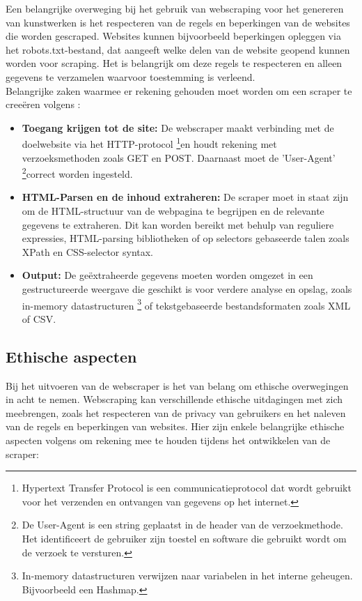 Een belangrijke overweging bij het gebruik van webscraping voor het genereren van kunstwerken is het respecteren van de regels en beperkingen van de websites die worden gescraped. Websites kunnen bijvoorbeeld beperkingen opleggen via het robots.txt-bestand, dat aangeeft welke delen van de website geopend kunnen worden voor scraping. Het is belangrijk om deze regels te respecteren en alleen gegevens te verzamelen waarvoor toestemming is verleend. \\

Belangrijke zaken waarmee er rekening gehouden moet worden om een scraper te creeëren volgens \autocite{BIO2014}:

\begin{itemize}
    \item \textbf{Toegang krijgen tot de site:} De webscraper maakt verbinding met de doelwebsite via het HTTP-protocol \footnote{Hypertext Transfer Protocol is een communicatieprotocol dat wordt gebruikt voor het verzenden en ontvangen van gegevens op het internet.}en houdt rekening met verzoeksmethoden zoals GET en POST. Daarnaast moet de 'User-Agent' \footnote{De User-Agent is een string geplaatst in de header van de verzoekmethode. Het identificeert de gebruiker zijn toestel en software die gebruikt wordt om de verzoek te versturen.}correct worden ingesteld.
    \item \textbf{HTML-Parsen en de inhoud extraheren:} De scraper moet in staat zijn om de HTML-structuur van de webpagina te begrijpen en de relevante gegevens te extraheren. Dit kan worden bereikt met behulp van reguliere expressies, HTML-parsing bibliotheken of op selectors gebaseerde talen zoals XPath en CSS-selector syntax.
    \item \textbf{Output:} De geëxtraheerde gegevens moeten worden omgezet in een gestructureerde weergave die geschikt is voor verdere analyse en opslag, zoals in-memory datastructuren \footnote{In-memory datastructuren verwijzen naar variabelen in het interne geheugen. Bijvoorbeeld een Hashmap.} of tekstgebaseerde bestandsformaten zoals XML of CSV.
\end{itemize}

\subsection{Ethische aspecten}
\label{subsection:scraper-ethische-aspecten}
Bij het uitvoeren van de webscraper is het van belang om ethische overwegingen in acht te nemen. Webscraping kan verschillende ethische uitdagingen met zich meebrengen, zoals het respecteren van de privacy van gebruikers en het naleven van de regels en beperkingen van websites. Hier zijn enkele belangrijke ethische aspecten volgens \textcite{scrape_ethics} om rekening mee te houden tijdens het ontwikkelen van de scraper: 

